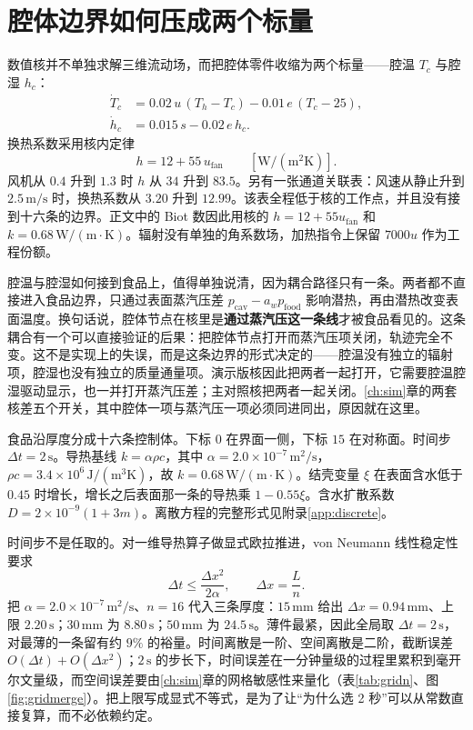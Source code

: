 \section{腔体边界如何压成两个标量}

数值核并不单独求解三维流动场，而把腔体零件收缩为两个标量——腔温 \(T_c\) 与腔湿 \(h_c\)：
\begin{align}
\dot T_c &= 0.02\,u\,(T_h-T_c)-0.01\,e\,(T_c-25),\\
\dot h_c &= 0.015\,s-0.02\,e\,h_c.
\end{align}
换热系数采用核内定律
\[
h=12+55\,u_{\mathrm{fan}}\qquad[\mathrm{W}/(\mathrm{m}^2\mathrm{K})].
\]
风机从 \(0.4\) 升到 \(1.3\) 时 \(h\) 从 \(34\) 升到 \(83.5\)。另有一张通道关联表：风速从静止升到 \(2.5\,\mathrm{m/s}\) 时，换热系数从 \(3.20\) 升到 \(12.99\)。该表全程低于核的工作点，并且没有接到十六条的边界。正文中的 Biot 数因此用核的 \(h=12+55u_{\mathrm{fan}}\) 和 \(k=0.68\,\mathrm{W}/(\mathrm{m\cdot K})\)。辐射没有单独的角系数场，加热指令上保留 \(7000u\) 作为工程份额。

腔温与腔湿如何接到食品上，值得单独说清，因为耦合路径只有一条。两者都不直接进入食品边界，只通过表面蒸汽压差 \(p_{\mathrm{cav}}-a_wp_{\mathrm{food}}\) 影响潜热，再由潜热改变表面温度。换句话说，腔体节点在核里是\textbf{通过蒸汽压这一条线}才被食品看见的。这条耦合有一个可以直接验证的后果：把腔体节点打开而蒸汽压项关闭，轨迹完全不变。这不是实现上的失误，而是这条边界的形式决定的——腔温没有独立的辐射项，腔湿也没有独立的质量通量项。演示版核因此把两者一起打开，它需要腔温腔湿驱动显示，也一并打开蒸汽压差；主对照核把两者一起关闭。\ref{ch:sim}{}章的两套核差五个开关，其中腔体一项与蒸汽压一项必须同进同出，原因就在这里。

食品沿厚度分成十六条控制体。下标 \(0\) 在界面一侧，下标 \(15\) 在对称面。时间步 \(\Delta t=2\,\mathrm{s}\)。导热基线 \(k=\alpha\rho c\)，其中 \(\alpha=2.0\times 10^{-7}\,\mathrm{m}^2/\mathrm{s}\)，\(\rho c=3.4\times 10^{6}\,\mathrm{J}/(\mathrm{m}^3\mathrm{K})\)，故 \(k=0.68\,\mathrm{W}/(\mathrm{m\cdot K})\)。结壳变量 \(\xi\) 在表面含水低于 \(0.45\) 时增长，增长之后表面那一条的导热乘 \(1-0.55\xi\)。含水扩散系数 \(D=2\times 10^{-9}(1+3m)\)。离散方程的完整形式见附录\ref{app:discrete}。

时间步不是任取的。对一维导热算子做显式欧拉推进，von Neumann 线性稳定性要求
\begin{equation}
\label{eq:cfl}
\Delta t\le\frac{\Delta x^{2}}{2\alpha},\qquad \Delta x=\frac{L}{n}.
\end{equation}
把 \(\alpha=2.0\times 10^{-7}\,\mathrm{m^2/s}\)、\(n=16\) 代入三条厚度：\(15\,\mathrm{mm}\) 给出 \(\Delta x=0.94\,\mathrm{mm}\)、上限 \(2.20\,\mathrm{s}\)；\(30\,\mathrm{mm}\) 为 \(8.80\,\mathrm{s}\)；\(50\,\mathrm{mm}\) 为 \(24.5\,\mathrm{s}\)。薄件最紧，因此全局取 \(\Delta t=2\,\mathrm{s}\)，对最薄的一条留有约 \(9\%\) 的裕量。时间离散是一阶、空间离散是二阶，截断误差 \(O(\Delta t)+O(\Delta x^{2})\)；\(2\,\mathrm{s}\) 的步长下，时间误差在一分钟量级的过程里累积到毫开尔文量级，而空间误差要由\ref{ch:sim}{}章的网格敏感性来量化（表\ref{tab:gridn}、图\ref{fig:gridmerge}）。把上限写成显式不等式，是为了让“为什么选 2 秒”可以从常数直接复算，而不必依赖约定。

